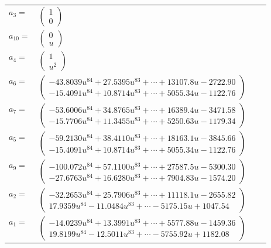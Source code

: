 \documentclass[1p]{elsarticle_modified}
\theoremstyle{definition}
\begin{document}
\begin{tabular}{m{7pt} m{180pt} m{7pt} m{180pt} }
\flushright $a_{3}=$&$\begin{pmatrix}1\\0\end{pmatrix}$ \\
\flushright $a_{10}=$&$\begin{pmatrix}0\\u\end{pmatrix}$ \\
\flushright $a_{4}=$&$\begin{pmatrix}1\\u^2\end{pmatrix}$ \\
\flushright $a_{6}=$&$\begin{pmatrix}-43.8039 u^{84}+27.5395 u^{83}+\cdots+13107.8 u-2722.90\\-15.4091 u^{84}+10.8714 u^{83}+\cdots+5055.34 u-1122.76\end{pmatrix}$ \\
\flushright $a_{7}=$&$\begin{pmatrix}-53.6006 u^{84}+34.8765 u^{83}+\cdots+16389.4 u-3471.58\\-15.7706 u^{84}+11.3455 u^{83}+\cdots+5250.63 u-1179.34\end{pmatrix}$ \\
\flushright $a_{5}=$&$\begin{pmatrix}-59.2130 u^{84}+38.4110 u^{83}+\cdots+18163.1 u-3845.66\\-15.4091 u^{84}+10.8714 u^{83}+\cdots+5055.34 u-1122.76\end{pmatrix}$ \\
\flushright $a_{9}=$&$\begin{pmatrix}-100.072 u^{84}+57.1100 u^{83}+\cdots+27587.5 u-5300.30\\-27.6763 u^{84}+16.6280 u^{83}+\cdots+7904.83 u-1574.20\end{pmatrix}$ \\
\flushright $a_{2}=$&$\begin{pmatrix}-32.2653 u^{84}+25.7906 u^{83}+\cdots+11118.1 u-2655.82\\17.9359 u^{84}-11.0484 u^{83}+\cdots-5175.15 u+1047.54\end{pmatrix}$ \\
\flushright $a_{1}=$&$\begin{pmatrix}-14.0239 u^{84}+13.3991 u^{83}+\cdots+5577.88 u-1459.36\\19.8199 u^{84}-12.5011 u^{83}+\cdots-5755.92 u+1182.08\end{pmatrix}$ \\

\end{tabular}
\end{document}
